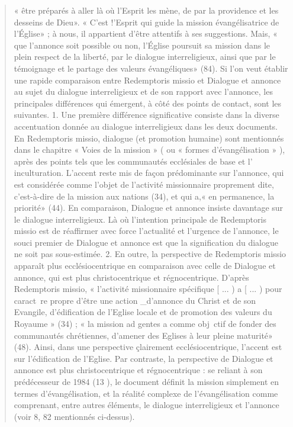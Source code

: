 \begin{quote}
« être préparés à aller là où l'Esprit les mène, de par la providence
et les desseins de Dieu». « C'est !'Esprit qui guide la
mission évangélisatrice de l'Église» ; à nous, il appartient
d'être attentifs à ses suggestions. Mais, « que l'annonce soit
possible ou non, l'Église poursuit sa mission dans le plein respect
de la liberté, par le dialogue interreligieux, ainsi que par
le témoignage et le partage des valeurs évangéliques» (84).
Si l'on veut établir une rapide comparaison entre Redemptoris
missio et Dialogue et annonce au sujet du dialogue interreligieux
et de son rapport avec l'annonce, les principales
différences qui émergent, à côté des points de contact, sont les
suivantes.
1. Une première différence significative consiste dans la
diverse accentuation donnée au dialogue interreligieux dans
les deux documents. En Redemptoris missio, dialogue (et promotion
humaine) sont mentionnés dans le chapitre « Voies de
la mission » ( ou « formes d'évangélisation » ), après des points
tels que les communautés ecclésiales de base et l' inculturation.
L'accent reste mis de façon prédominante sur l'annonce, qui
est considérée comme l'objet de l'activité missionnaire proprement
dite, c'est-à-dire de la mission aux nations (34), et qui
a,« en permanence, la priorité» (44). En comparaison, Dialogue
et annonce insiste davantage sur le dialogue interreligieux. Là
où l'intention principale de Redemptoris missio est de réaffirmer
avec force l'actualité et l'urgence de l'annonce, le souci
premier de Dialogue et annonce est que la signification du
dialogue ne soit pas sous-estimée.
2. En outre, la perspective de Redemptoris missio apparaît
plus ecclésiocentrique en comparaison avec celle de Dialogue
et annonce, qui est plus christocentrique et régnocentrique.
D'après Redemptoris missio, « l'activité missionnaire spécifique
[ ... ) a [ ... ) pour caract~re propre d'être une action _d'annonce
du Christ et de son Evangile, d'édification de l'Eglise
locale et de promotion des valeurs du Royaume » (34) ; « la
mission ad gentes a comme obj~ctif de fonder des communautés
chrétiennes, d'amener des Eglises à leur pleine maturité»
(48). Ainsi, dans une perspective çlairement ecclésiocentrique,
l'accent est sur l'édification de l'Eglise. Par contraste, la perspective
de Dialogue et annonce est plus christocentrique et
régnocentrique : se reliant à son prédécesseur de 1984 (13 ), le
document définit la mission simplement en termes d'évangélisation,
et la réalité complexe de l'évangélisation comme
comprenant, entre autres éléments, le dialogue interreligieux
et l'annonce (voir 8, 82 mentionnés ci-dessus).

\end{quote}
